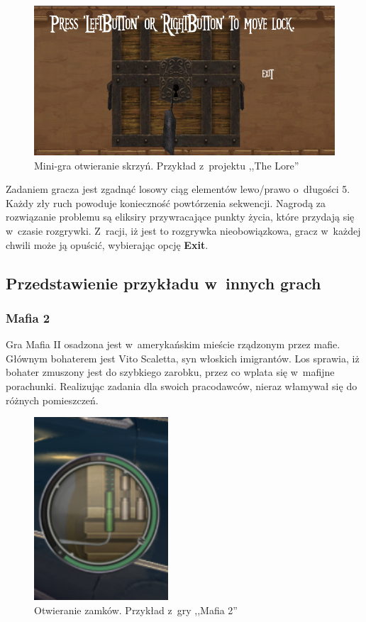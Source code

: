 \documentclass[oneside,polski,logo]{amuthesis}
\begin{document}
\begin{figure}[h]
	\centering
	\includegraphics[width=12cm]{images/tyrek/minigraskrzynia.png}
	\caption{Mini-gra otwieranie skrzyń. Przykład z~projektu ,,The Lore''}
\end{figure}

Zadaniem gracza jest zgadnąć losowy ciąg elementów lewo/prawo o~długości 5. Każdy zły ruch powoduje konieczność powtórzenia sekwencji. Nagrodą za rozwiązanie problemu są eliksiry przywracające punkty życia, które przydają się w~czasie rozgrywki. Z~racji, iż jest to rozgrywka nieobowiązkowa, gracz w~każdej chwili może ją opuścić, wybierając opcję \textbf{Exit}.
\subsection{Przedstawienie przykładu w~innych grach}
\subsubsection{Mafia 2}
\par Gra Mafia II osadzona jest w~amerykańskim mieście rządzonym przez mafie. Głównym bohaterem jest Vito Scaletta, syn włoskich imigrantów. Los sprawia, iż bohater zmuszony jest do szybkiego zarobku, przez co wplata się w~mafijne porachunki. Realizując zadania dla swoich pracodawców, nieraz włamywał się do różnych pomieszczeń. 

\begin{figure}[h!]
	\centering
	\includegraphics[width=5cm]{images/tyrek/Mafia2.png}
	\caption{Otwieranie zamków. Przykład z~gry ,,Mafia 2''}
\end{figure}
\end{document}
